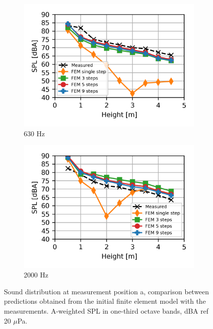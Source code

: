 \begin{figure}[H]
	\begin{subfigure}[b]{0.49\textwidth}
		\centering
		\includegraphics{fig/chap5/freq_steps/third_octave_over_height/630_Hz.png}
		\caption{630 Hz}
	\end{subfigure}
	\begin{subfigure}[b]{0.49\textwidth}
		\centering
		\includegraphics{fig/chap5/freq_steps/third_octave_over_height/2000_Hz.png}
		\caption{2000 Hz}
	\end{subfigure}
	
	\caption{Sound distribution at measurement position a, comparison between predictions obtained from the initial finite element model with the measurements. A-weighted SPL in one-third octave bands, dBA ref 20 $\mu$Pa.}
	\label{fig:third_octave_over_height_freq_steps}
\end{figure}


